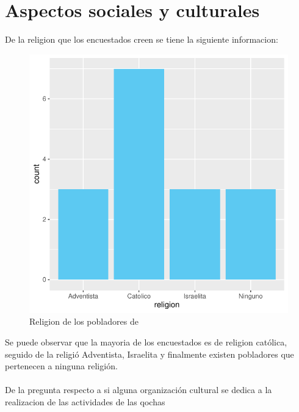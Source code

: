 \documentclass[12pt]{article}\usepackage[]{graphicx}\usepackage[]{xcolor}
\makeatletter
\def\maxwidth{ %
  \ifdim\Gin@nat@width>\linewidth
    \linewidth
  \else
    \Gin@nat@width
  \fi
}
\newenvironment{knitrout}{}{} %
\makeatother
\begin{document}
	\section{Aspectos sociales y culturales}
	De la religion que los encuestados creen se tiene la siguiente informacion:
	\begin{figure}[H]
	\centering
\begin{knitrout}
\color{fgcolor}
\includegraphics[width=\maxwidth]{figure/veintiuno-1} 
\end{knitrout}
	\caption{Religion de los pobladores de \comunidad}
	\end{figure}
	Se puede observar que la mayoria de los encuestados es de religion católica, seguido de la religió Adventista, Israelita y  finalmente existen pobladores que pertenecen a ninguna religión.\\
	\\
	De la pregunta respecto a si alguna organización cultural se dedica a la realizacion de las actividades de las qochas
\end{document}
